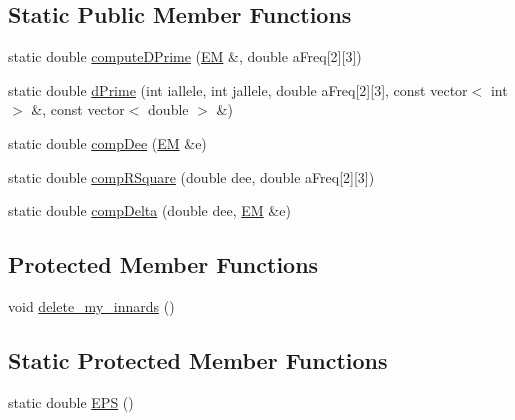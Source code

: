 \subsection*{Static Public Member Functions}
\begin{DoxyCompactItemize}
\item 
static double \hyperlink{classLinkageDisequilibrium_a6207b7cc0fa21495363246ec41ee3164}{computeDPrime} (\hyperlink{classEM}{EM} \&, double aFreq\mbox{[}2\mbox{]}\mbox{[}3\mbox{]})
\item 
static double \hyperlink{classLinkageDisequilibrium_a24f37b16583031e1b335109fe0755a24}{dPrime} (int iallele, int jallele, double aFreq\mbox{[}2\mbox{]}\mbox{[}3\mbox{]}, const vector$<$ int $>$ \&, const vector$<$ double $>$ \&)
\item 
static double \hyperlink{classLinkageDisequilibrium_a368b63fa8f9f18804ad9f588c6bb4dbb}{compDee} (\hyperlink{classEM}{EM} \&e)
\item 
static double \hyperlink{classLinkageDisequilibrium_a94dde069bebfff0977e49d556c29fad4}{compRSquare} (double dee, double aFreq\mbox{[}2\mbox{]}\mbox{[}3\mbox{]})
\item 
static double \hyperlink{classLinkageDisequilibrium_a6a3f41206e3713204eaab35faf89c65b}{compDelta} (double dee, \hyperlink{classEM}{EM} \&e)
\end{DoxyCompactItemize}
\subsection*{Protected Member Functions}
\begin{DoxyCompactItemize}
\item 
void \hyperlink{classLinkageDisequilibrium_aae443ca228a7ae15b3611c1c6d8429ad}{delete\_\-my\_\-innards} ()
\end{DoxyCompactItemize}
\subsection*{Static Protected Member Functions}
\begin{DoxyCompactItemize}
\item 
static double \hyperlink{classLinkageDisequilibrium_a9920e98718ecb60c5b33c90ae2fb6c89}{EPS} ()
\end{DoxyCompactItemize}
